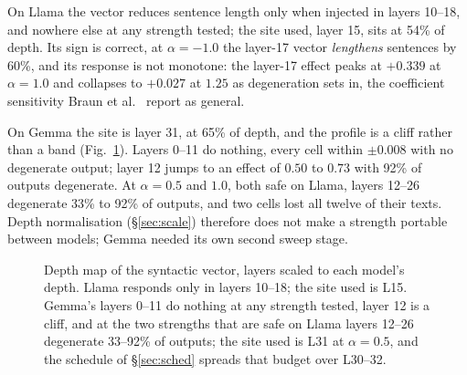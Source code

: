 \documentclass[aps,prb,reprint,nofootinbib,a4paper]{revtex4-2}
\begin{document}
On Llama the vector reduces sentence length only when injected in layers
10--18, and nowhere else at any strength tested; the site used, layer 15, sits
at 54\% of depth. Its sign is correct, at $\alpha=-1.0$ the layer-17 vector
\emph{lengthens} sentences by 60\%, and its response is not monotone: the
layer-17 effect peaks at $+0.339$ at $\alpha=1.0$ and collapses to $+0.027$ at
$1.25$ as degeneration sets in, the coefficient sensitivity Braun et
al.~\cite{braun2025} report as general.

On Gemma the site is layer 31, at 65\% of depth, and the profile is a cliff
rather than a band (Fig.~\ref{fig:depthmap}). Layers 0--11 do nothing, every
cell within $\pm 0.008$ with no degenerate output; layer 12 jumps to an effect
of $0.50$ to $0.73$ with 92\% of outputs degenerate. At $\alpha=0.5$ and
$1.0$, both safe on Llama, layers 12--26 degenerate 33\% to 92\% of outputs,
and two cells lost all twelve of their texts. Depth normalisation
(\S\ref{sec:scale}) therefore does not make a strength portable between
models; Gemma needed its own second sweep stage.

\begin{figure}[t]
\centering
{}
\caption{Depth map of the syntactic vector, layers scaled to each model's
depth. Llama responds only in layers 10--18; the site used is L15. Gemma's
layers 0--11 do nothing at any strength tested, layer 12 is a cliff, and at the
two strengths that are safe on Llama layers 12--26 degenerate 33--92\% of
outputs; the site used is L31 at $\alpha=0.5$, and the schedule of
\S\ref{sec:sched} spreads that budget over L30--32.}
\label{fig:depthmap}
\end{figure}
\end{document}
